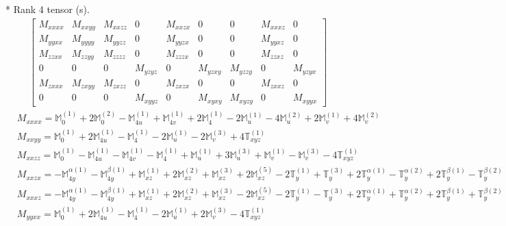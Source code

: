 \documentclass[fleqn,8pt,landscape]{jsarticle}
\begin{document}
* Rank 4 tensor (s).
\begin{align*}
\begin{bmatrix} M_{xxxx} & M_{xxyy} & M_{xxzz} & 0 & M_{xxzx} & 0 & 0 & M_{xxxz} & 0 \\ M_{yyxx} & M_{yyyy} & M_{yyzz} & 0 & M_{yyzx} & 0 & 0 & M_{yyxz} & 0 \\ M_{zzxx} & M_{zzyy} & M_{zzzz} & 0 & M_{zzzx} & 0 & 0 & M_{zzxz} & 0 \\ 0 & 0 & 0 & M_{yzyz} & 0 & M_{yzxy} & M_{yzzy} & 0 & M_{yzyx} \\ M_{zxxx} & M_{zxyy} & M_{zxzz} & 0 & M_{zxzx} & 0 & 0 & M_{zxxz} & 0 \\ 0 & 0 & 0 & M_{xyyz} & 0 & M_{xyxy} & M_{xyzy} & 0 & M_{xyyx} \end{bmatrix}
\end{align*}
\begin{align*}
& M_{xxxx} = \mathbb{M}_{0}^{(1)} + 2 \mathbb{M}_{0}^{(2)} - \mathbb{M}_{4u}^{(1)} + \mathbb{M}_{4v}^{(1)} + 2 \mathbb{M}_{4}^{(1)} - 2 \mathbb{M}_{u}^{(1)} - 4 \mathbb{M}_{u}^{(2)} + 2 \mathbb{M}_{v}^{(1)} + 4 \mathbb{M}_{v}^{(2)} \\
& M_{xxyy} = \mathbb{M}_{0}^{(1)} + 2 \mathbb{M}_{4u}^{(1)} - \mathbb{M}_{4}^{(1)} - 2 \mathbb{M}_{u}^{(1)} - 2 \mathbb{M}_{v}^{(3)} + 4 \mathbb{T}_{xyz}^{(1)} \\
& M_{xxzz} = \mathbb{M}_{0}^{(1)} - \mathbb{M}_{4u}^{(1)} - \mathbb{M}_{4v}^{(1)} - \mathbb{M}_{4}^{(1)} + \mathbb{M}_{u}^{(1)} + 3 \mathbb{M}_{u}^{(3)} + \mathbb{M}_{v}^{(1)} - \mathbb{M}_{v}^{(3)} - 4 \mathbb{T}_{xyz}^{(1)} \\
& M_{xxzx} = - \mathbb{M}_{4y}^{\alpha(1)} - \mathbb{M}_{4y}^{\beta(1)} + \mathbb{M}_{xz}^{(1)} + 2 \mathbb{M}_{xz}^{(2)} + \mathbb{M}_{xz}^{(3)} + 2 \mathbb{M}_{xz}^{(5)} - 2 \mathbb{T}_{y}^{(1)} + \mathbb{T}_{y}^{(3)} + 2 \mathbb{T}_{y}^{\alpha(1)} - \mathbb{T}_{y}^{\alpha(2)} + 2 \mathbb{T}_{y}^{\beta(1)} - \mathbb{T}_{y}^{\beta(2)} \\
& M_{xxxz} = - \mathbb{M}_{4y}^{\alpha(1)} - \mathbb{M}_{4y}^{\beta(1)} + \mathbb{M}_{xz}^{(1)} + 2 \mathbb{M}_{xz}^{(2)} + \mathbb{M}_{xz}^{(3)} - 2 \mathbb{M}_{xz}^{(5)} - 2 \mathbb{T}_{y}^{(1)} - \mathbb{T}_{y}^{(3)} + 2 \mathbb{T}_{y}^{\alpha(1)} + \mathbb{T}_{y}^{\alpha(2)} + 2 \mathbb{T}_{y}^{\beta(1)} + \mathbb{T}_{y}^{\beta(2)} \\
& M_{yyxx} = \mathbb{M}_{0}^{(1)} + 2 \mathbb{M}_{4u}^{(1)} - \mathbb{M}_{4}^{(1)} - 2 \mathbb{M}_{u}^{(1)} + 2 \mathbb{M}_{v}^{(3)} - 4 \mathbb{T}_{xyz}^{(1)} \\

\end{align*}
\end{document}

